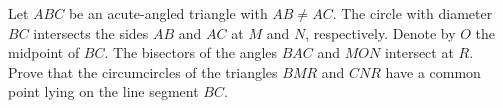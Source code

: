 Let $ABC$ be an acute-angled triangle with $AB \neq AC$. The circle with diameter $BC$ intersects the sides $AB$ and $AC$ at $M$ and $N$, respectively. Denote by $O$ the midpoint of $BC$. The bisectors of the angles $BAC$ and $MON$ intersect at $R$. Prove that the circumcircles of the triangles $BMR$ and $CNR$ have a common point lying on the line segment $BC$.
